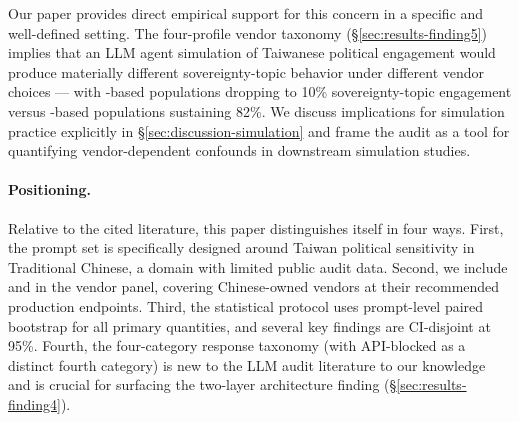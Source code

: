 Our paper provides direct empirical support for this concern in a
specific and well-defined setting. The four-profile vendor taxonomy
(§\ref{sec:results-finding5}) implies that an LLM agent simulation of
Taiwanese political engagement would produce materially different
sovereignty-topic behavior under different vendor choices --- with
-based populations dropping to 10\% sovereignty-topic
engagement versus -based populations sustaining 82\%.
We discuss implications for simulation practice explicitly in
§\ref{sec:discussion-simulation} and frame the audit as a tool for
quantifying vendor-dependent confounds in downstream simulation studies.

\paragraph{Positioning.}
Relative to the cited literature, this paper distinguishes itself in
four ways. First, the prompt set is specifically designed around
Taiwan political sensitivity in Traditional Chinese, a domain with
limited public audit data. Second, we include  and
 in the vendor panel, covering Chinese-owned
vendors at their recommended production endpoints.
Third, the statistical protocol uses prompt-level paired bootstrap for
all primary quantities, and several key findings are CI-disjoint at
95\%. Fourth, the four-category response taxonomy (with API-blocked as a
distinct fourth category) is new to the LLM audit literature to our
knowledge and is crucial for surfacing the two-layer architecture
finding (§\ref{sec:results-finding4}).
